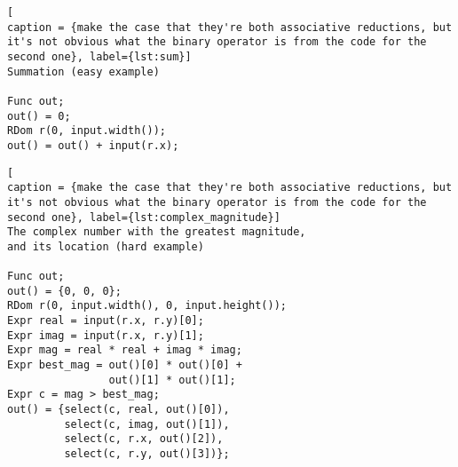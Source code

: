 \begin{lstlisting}[
caption = {make the case that they're both associative reductions, but it's not obvious what the binary operator is from the code for the second one}, label={lst:sum}]
Summation (easy example)

Func out;
out() = 0;
RDom r(0, input.width());
out() = out() + input(r.x);
\end{lstlisting}

\begin{lstlisting}[
caption = {make the case that they're both associative reductions, but it's not obvious what the binary operator is from the code for the second one}, label={lst:complex_magnitude}]
The complex number with the greatest magnitude, 
and its location (hard example)

Func out;
out() = {0, 0, 0};
RDom r(0, input.width(), 0, input.height());
Expr real = input(r.x, r.y)[0];
Expr imag = input(r.x, r.y)[1];
Expr mag = real * real + imag * imag;
Expr best_mag = out()[0] * out()[0] + 
                out()[1] * out()[1];
Expr c = mag > best_mag;
out() = {select(c, real, out()[0]),
         select(c, imag, out()[1]),
         select(c, r.x, out()[2]),
         select(c, r.y, out()[3])};
\end{lstlisting}